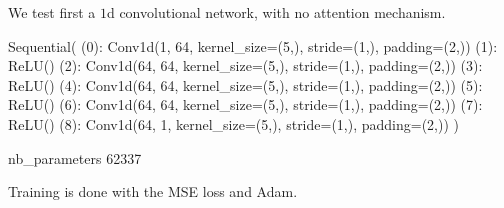 \documentclass[c,8pt]{beamer}
\begin{document}
\begin{frame}[fragile]

We test first a $1$d convolutional network, with no attention
mechanism.

\begin{rawsrc}
Sequential(
  (0): Conv1d(1, 64, kernel_size=(5,), stride=(1,), padding=(2,))
  (1): ReLU()
  (2): Conv1d(64, 64, kernel_size=(5,), stride=(1,), padding=(2,))
  (3): ReLU()
  (4): Conv1d(64, 64, kernel_size=(5,), stride=(1,), padding=(2,))
  (5): ReLU()
  (6): Conv1d(64, 64, kernel_size=(5,), stride=(1,), padding=(2,))
  (7): ReLU()
  (8): Conv1d(64, 1, kernel_size=(5,), stride=(1,), padding=(2,))
)

nb_parameters 62337
\end{rawsrc}


\end{frame}


\begin{frame}[fragile]

Training is done with the MSE loss and Adam.






\end{frame}

\end{document}
